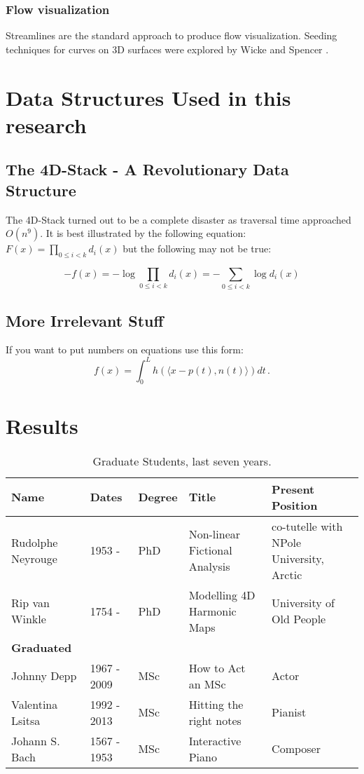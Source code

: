 \documentclass[11pt]{report}
\begin{document}
\subsection{Flow visualization}

Streamlines are the standard approach to produce flow visualization. 
Seeding techniques for curves on 3D surfaces were explored by
Wicke \cite{Wicke2009} and Spencer \cite{Spencer2009}.

\chapter{Data Structures Used in this research}
\section{The 4D-Stack - A Revolutionary Data Structure}
The 4D-Stack turned out to be a complete disaster as traversal time approached $O(n^9).$
It is best illustrated by the following equation: $F(x) = \prod_{0\leq i<k}d_i(x)$
but the following may not be true:

\[
-f(x) = - \log \prod_{0\leq i<k}d_i(x) = - \sum_{0\leq i<k} \log d_i(x)
\]


\section{More Irrelevant Stuff}
If you want to put numbers on equations use this form:
\begin{equation}
\label{integralrep}
f(x)=\int_0^L h( \langle x-p(t),n(t) \rangle ) dt\,.
\end{equation}



\chapter{Results}
\begin{table}[tbp]
\begin{tabular}{||l|l|l|p{1.5in}|p{1.2in}||}
\hline
\hline
Name & Dates & Degree & Title & Present Position \\
\hline
Rudolphe Neyrouge & 1953  - & PhD &  Non-linear Fictional Analysis &  co-tutelle with NPole University, Arctic \\
Rip van Winkle & 1754 -  & PhD & Modelling 4D Harmonic Maps & University of Old People \\

\hline
{\bf Graduated} &&&& \\
\hline
Johnny Depp & 1967 - 2009 & MSc & How to Act an MSc & Actor \\
Valentina Lsitsa & 1992 - 2013 & MSc & Hitting the right notes &  Pianist  \\
Johann S. Bach & 1567 - 1953 & MSc & Interactive Piano  & Composer \\\hline
\hline
\end{tabular}
\caption{\label{stud-table} Graduate Students, last seven years.}
\end{table}
\end{document}
